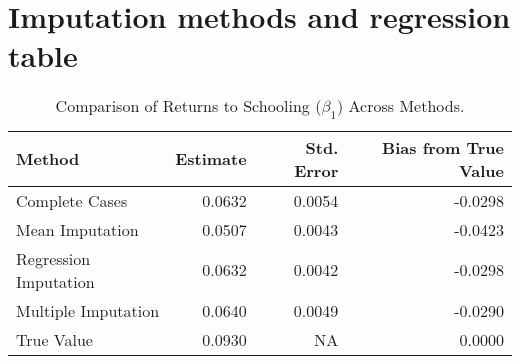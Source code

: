 \documentclass[12pt,letterpaper]{article}
\begin{document}
\section{Imputation methods and regression table}
\begin{table}[ht]
\centering
\caption{Comparison of Returns to Schooling ($\beta_1$) Across Methods.}
\centering
\begin{tabular}[t]{lrrr}
\toprule
Method & Estimate & Std. Error & Bias from True Value\\
\midrule
Complete Cases & 0.0632 & 0.0054 & -0.0298\\
Mean Imputation & 0.0507 & 0.0043 & -0.0423\\
Regression Imputation & 0.0632 & 0.0042 & -0.0298\\
Multiple Imputation & 0.0640 & 0.0049 & -0.0290\\
True Value & 0.0930 & NA & 0.0000\\
\bottomrule
\end{tabular}
\end{table}
\end{document}
